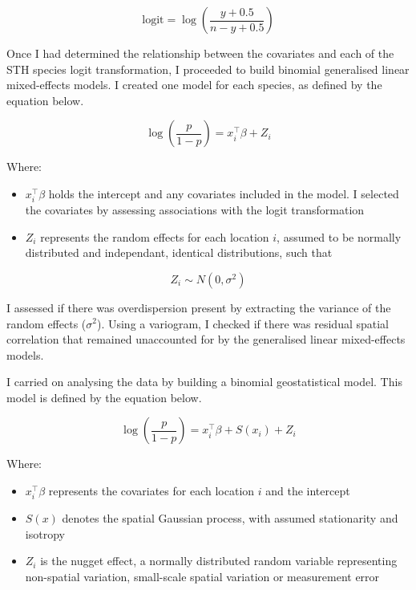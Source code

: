 \documentclass[
]{article}
\providecommand{\tightlist}{%
  \setlength{\itemsep}{0pt}\setlength{\parskip}{0pt}}
\begin{document}
\[ \text{logit} = \log\left(\frac{y+0.5}{n-y+0.5}\right) \]

Once I had determined the relationship between the covariates and each
of the STH species logit transformation, I proceeded to build binomial
generalised linear mixed-effects models. I created one model for each
species, as defined by the equation below.

\[ \log\left(\frac{p}{1-p}\right) = x_i^\intercal\beta + Z_i \]

Where:

\begin{itemize}
\tightlist
\item
  \(x_i^\intercal\beta\) holds the intercept and any covariates included
  in the model. I selected the covariates by assessing associations with
  the logit transformation
\item
  \(Z_i\) represents the random effects for each location \(i\), assumed
  to be normally distributed and independant, identical distributions,
  such that
\end{itemize}

\[ Z_i \sim N(0, \sigma^2)  \]

I assessed if there was overdispersion present by extracting the
variance of the random effects (\(\sigma^2\)). Using a variogram, I
checked if there was residual spatial correlation that remained
unaccounted for by the generalised linear mixed-effects models.

I carried on analysing the data by building a binomial geostatistical
model. This model is defined by the equation below.

\[ \log\left(\frac{p}{1-p}\right) = x_i^\intercal\beta + S(x_i) + Z_i \]

Where:

\begin{itemize}
\tightlist
\item
  \(x_i^\intercal\beta\) represents the covariates for each location
  \(i\) and the intercept
\item
  \(S(x)\) denotes the spatial Gaussian process, with assumed
  stationarity and isotropy
\item
  \(Z_i\) is the nugget effect, a normally distributed random variable
  representing non-spatial variation, small-scale spatial variation or
  measurement error
\end{itemize}
\end{document}
